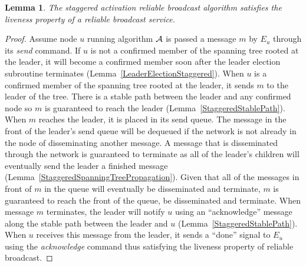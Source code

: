 \documentclass[english]{article}
\newtheorem{lemma}[theorem]{Lemma}
\begin{document}
\begin{lemma}
\label{StaggeredRBLiveness}
The staggered activation reliable broadcast algorithm satisfies the liveness property of a reliable broadcast service.
\end{lemma}
\begin{proof}

Assume node $u$ running algorithm $\cal A$ is passed a message $m$ by $E_u$ through its \textit{send} command. If $u$ is not a confirmed member of the spanning tree rooted at the leader, it will become a confirmed member soon after the leader election subroutine terminates (Lemma~\ref{LeaderElectionStaggered}). When $u$ is a confirmed member of the spanning tree rooted at the leader, it sends $m$ to the leader of the tree. There is a stable path between the leader and any confirmed node so $m$ is guaranteed to reach the leader (Lemma~\ref{StaggeredStablePath}). When $m$ reaches the leader, it is placed in its send queue. The message in the front of the leader's send queue will be dequeued if the network is not already in the node of disseminating another message. A message that is disseminated through the network is guaranteed to terminate as all of the leader's children will eventually send the leader a finished message (Lemma~\ref{StaggeredSpanningTreePropagation}). Given that all of the messages in front of $m$ in the queue will eventually be disseminated and terminate, $m$ is guaranteed to reach the front of the queue, be disseminated and terminate. When message $m$ terminates, the leader will notify $u$ using an ``acknowledge'' message along the stable path between the leader and $u$ (Lemma~\ref{StaggeredStablePath}). When $u$ receives this message from the leader, it sends  a ``done'' signal to $E_u$ using the \textit{acknowledge} command thus satisfying the liveness property of reliable broadcast.


\end{proof}
\end{document}
